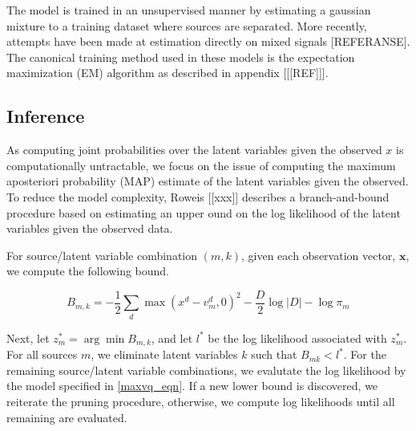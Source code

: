 \documentclass[11pt, oneside, a4paper]{report}
\begin{document}
The model is trained in an unsupervised manner by estimating a gaussian mixture to a training dataset where sources are separated. More recently, attempts have been made at estimation directly on mixed signals [REFERANSE]. The canonical training method used in these models is the expectation maximization (EM) algorithm as described in appendix [[[REF]]]. 

\subsection{Inference}

As computing joint probabilities over the latent variables given the observed $x$ is computationally untractable, we focus on the issue of computing the maximum aposteriori probability (MAP) estimate of the latent variables given the observed. To reduce the model complexity, Roweis [[xxx]] describes a branch-and-bound procedure based on estimating an upper ound on the log likelihood of the latent variables given the observed data.

For source/latent variable combination $(m,k)$, given each observation
vector, $\mathbf{x}$, we compute the following bound.

\begin{equation}\label{bound}
  B_{m,k} = -\frac{1}{2}\sum_d \max(x^d - v_m^d,0)^2 - \frac{D}{2}\log|D|-\log \pi_m
\end{equation}

Next, let $z_m^{*} = \arg \min B_{m,k}$, and let $l^{*}$ be
the log likelihood associated with $z_m^{*}$. For all sources $m$, we
eliminate latent variables $k$ such that $B_{mk}<l^{*}$. For the
remaining source/latent variable combinations, we evalutate the log
likelihood by the model specified in \ref{maxvq_eqn}. If a new lower
bound is discovered, we reiterate the pruning procedure, otherwise, we
compute log likelihoods until all remaining are evaluated.




\end{document}
